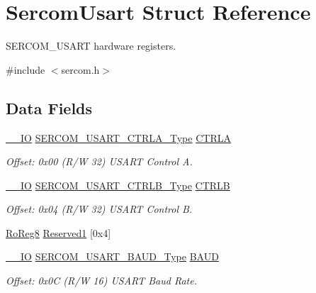 \hypertarget{struct_sercom_usart}{}\section{Sercom\+Usart Struct Reference}
\label{struct_sercom_usart}


S\+E\+R\+C\+O\+M\+\_\+\+U\+S\+A\+RT hardware registers.  




{\ttfamily \#include $<$sercom.\+h$>$}

\subsection*{Data Fields}
\begin{DoxyCompactItemize}
\item 
\mbox{\hyperlink{core__cm0plus_8h_aec43007d9998a0a0e01faede4133d6be}{\+\_\+\+\_\+\+IO}} \mbox{\hyperlink{union_s_e_r_c_o_m___u_s_a_r_t___c_t_r_l_a___type}{S\+E\+R\+C\+O\+M\+\_\+\+U\+S\+A\+R\+T\+\_\+\+C\+T\+R\+L\+A\+\_\+\+Type}} \mbox{\hyperlink{struct_sercom_usart_a6393331bbcb92d09cbebe604ae44233a}{C\+T\+R\+LA}}
\begin{DoxyCompactList}\small\item\em Offset\+: 0x00 (R/W 32) U\+S\+A\+RT Control A. \end{DoxyCompactList}\item 
\mbox{\hyperlink{core__cm0plus_8h_aec43007d9998a0a0e01faede4133d6be}{\+\_\+\+\_\+\+IO}} \mbox{\hyperlink{union_s_e_r_c_o_m___u_s_a_r_t___c_t_r_l_b___type}{S\+E\+R\+C\+O\+M\+\_\+\+U\+S\+A\+R\+T\+\_\+\+C\+T\+R\+L\+B\+\_\+\+Type}} \mbox{\hyperlink{struct_sercom_usart_a0c38e46fd8984007c22cb77f98eb5398}{C\+T\+R\+LB}}
\begin{DoxyCompactList}\small\item\em Offset\+: 0x04 (R/W 32) U\+S\+A\+RT Control B. \end{DoxyCompactList}\item 
\mbox{\hyperlink{group___s_a_m_d21_e15_a__definitions_ga0d957f1433aaf5d70e4dc2b68288442d}{Ro\+Reg8}} \mbox{\hyperlink{struct_sercom_usart_a1106a1fe7c5fa01a183c54b4b992a7f0}{Reserved1}} \mbox{[}0x4\mbox{]}
\item 
\mbox{\hyperlink{core__cm0plus_8h_aec43007d9998a0a0e01faede4133d6be}{\+\_\+\+\_\+\+IO}} \mbox{\hyperlink{union_s_e_r_c_o_m___u_s_a_r_t___b_a_u_d___type}{S\+E\+R\+C\+O\+M\+\_\+\+U\+S\+A\+R\+T\+\_\+\+B\+A\+U\+D\+\_\+\+Type}} \mbox{\hyperlink{struct_sercom_usart_ab773f38cda319609cc8686f57f8f1f46}{B\+A\+UD}}
\begin{DoxyCompactList}\small\item\em Offset\+: 0x0C (R/W 16) U\+S\+A\+RT Baud Rate. \end{DoxyCompactList}\item 

\end{DoxyCompactItemize}
